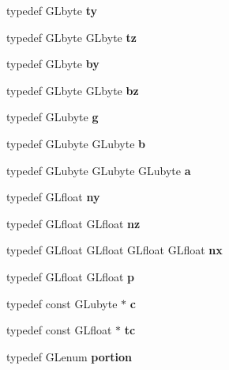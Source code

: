 \begin{DoxyCompactItemize}
\item 
typedef G\+Lbyte {\bfseries ty}\label{_s_d_l__opengl_8h_ae09063918284e24e3265a007fd1cc983}

\item 
typedef G\+Lbyte G\+Lbyte {\bfseries tz}\label{_s_d_l__opengl_8h_a0195ca51ebf5e9d2ad5665794b80d80e}

\item 
typedef G\+Lbyte {\bfseries by}\label{_s_d_l__opengl_8h_aee54e9aab2837a54be2ff5fb1c073bd2}

\item 
typedef G\+Lbyte G\+Lbyte {\bfseries bz}\label{_s_d_l__opengl_8h_a127048bfb84d994717266e27d9ae59e8}

\item 
typedef G\+Lubyte {\bfseries g}\label{_s_d_l__opengl_8h_acaceb3a655ff28b75259860bcb868f9f}

\item 
typedef G\+Lubyte G\+Lubyte {\bfseries b}\label{_s_d_l__opengl_8h_a0f71581a41fd2264c8944126dabbd010}

\item 
typedef G\+Lubyte G\+Lubyte G\+Lubyte {\bfseries a}\label{_s_d_l__opengl_8h_a3309789fc188587d666cda5ece79cf82}

\item 
typedef G\+Lfloat {\bfseries ny}\label{_s_d_l__opengl_8h_a5a459fddb3f3a7a2ee52f89967d9f501}

\item 
typedef G\+Lfloat G\+Lfloat {\bfseries nz}\label{_s_d_l__opengl_8h_a2999523991f24fec5d9f318db9701081}

\item 
typedef G\+Lfloat G\+Lfloat G\+Lfloat G\+Lfloat {\bfseries nx}\label{_s_d_l__opengl_8h_a7b63baa60e3c97412035037321a09313}

\item 
typedef G\+Lfloat G\+Lfloat {\bfseries p}\label{_s_d_l__opengl_8h_aa5367c14d90f462230c2611b81b41d23}

\item 
typedef const G\+Lubyte $\ast$ {\bfseries c}\label{_s_d_l__opengl_8h_a1f2d7f8147412c43ba2303a56f97ee73}

\item 
typedef const G\+Lfloat $\ast$ {\bfseries tc}\label{_s_d_l__opengl_8h_a45e774067520be559b8e78373132a9ec}

\item 
typedef G\+Lenum {\bfseries portion}\label{_s_d_l__opengl_8h_ac7573ca771f669e554cf6e3975ac7fcb}


\end{DoxyCompactItemize}

